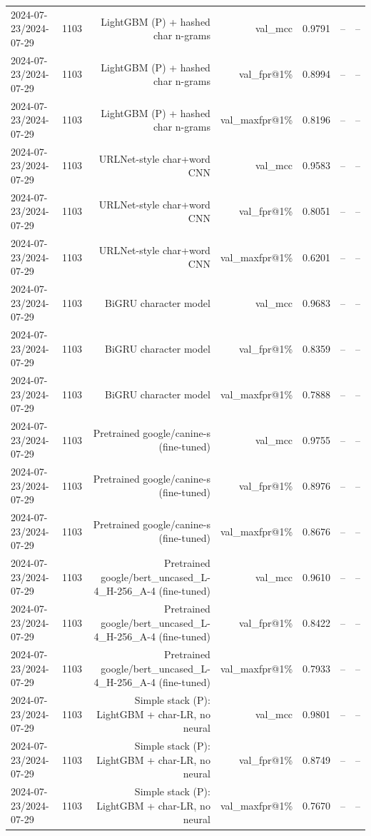 \begin{table}[t]
\begin{tabular}{llrrrrr}
2024-07-23/2024-07-29 & 1103 & LightGBM (P) + hashed char n-grams & val\_mcc & 0.9791 & -- & -- \\
2024-07-23/2024-07-29 & 1103 & LightGBM (P) + hashed char n-grams & val\_fpr@1\% & 0.8994 & -- & -- \\
2024-07-23/2024-07-29 & 1103 & LightGBM (P) + hashed char n-grams & val\_maxfpr@1\% & 0.8196 & -- & -- \\
2024-07-23/2024-07-29 & 1103 & URLNet-style char+word CNN & val\_mcc & 0.9583 & -- & -- \\
2024-07-23/2024-07-29 & 1103 & URLNet-style char+word CNN & val\_fpr@1\% & 0.8051 & -- & -- \\
2024-07-23/2024-07-29 & 1103 & URLNet-style char+word CNN & val\_maxfpr@1\% & 0.6201 & -- & -- \\
2024-07-23/2024-07-29 & 1103 & BiGRU character model & val\_mcc & 0.9683 & -- & -- \\
2024-07-23/2024-07-29 & 1103 & BiGRU character model & val\_fpr@1\% & 0.8359 & -- & -- \\
2024-07-23/2024-07-29 & 1103 & BiGRU character model & val\_maxfpr@1\% & 0.7888 & -- & -- \\
2024-07-23/2024-07-29 & 1103 & Pretrained google/canine-s (fine-tuned) & val\_mcc & 0.9755 & -- & -- \\
2024-07-23/2024-07-29 & 1103 & Pretrained google/canine-s (fine-tuned) & val\_fpr@1\% & 0.8976 & -- & -- \\
2024-07-23/2024-07-29 & 1103 & Pretrained google/canine-s (fine-tuned) & val\_maxfpr@1\% & 0.8676 & -- & -- \\
2024-07-23/2024-07-29 & 1103 & Pretrained google/bert\_uncased\_L-4\_H-256\_A-4 (fine-tuned) & val\_mcc & 0.9610 & -- & -- \\
2024-07-23/2024-07-29 & 1103 & Pretrained google/bert\_uncased\_L-4\_H-256\_A-4 (fine-tuned) & val\_fpr@1\% & 0.8422 & -- & -- \\
2024-07-23/2024-07-29 & 1103 & Pretrained google/bert\_uncased\_L-4\_H-256\_A-4 (fine-tuned) & val\_maxfpr@1\% & 0.7933 & -- & -- \\
2024-07-23/2024-07-29 & 1103 & Simple stack (P): LightGBM + char-LR, no neural & val\_mcc & 0.9801 & -- & -- \\
2024-07-23/2024-07-29 & 1103 & Simple stack (P): LightGBM + char-LR, no neural & val\_fpr@1\% & 0.8749 & -- & -- \\
2024-07-23/2024-07-29 & 1103 & Simple stack (P): LightGBM + char-LR, no neural & val\_maxfpr@1\% & 0.7670 & -- & -- \\

\end{tabular}
\end{table}
